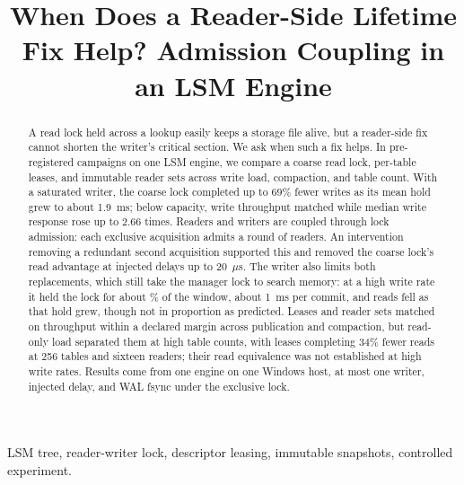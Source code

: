 \documentclass[conference]{IEEEtran}
\begin{document}
\raggedbottom
\title{When Does a Reader-Side Lifetime Fix Help? Admission Coupling in an LSM Engine}
\author{
}
\maketitle
\begin{abstract}
A read lock held across a lookup easily keeps a storage file alive, but a reader-side fix cannot shorten the writer's critical section. We ask when such a fix helps. In \FollowCampaignWord{} pre-registered campaigns on one LSM engine, we compare a coarse read lock, per-table leases, and immutable reader sets across write load, compaction, and table count. With a saturated writer, the coarse lock completed up to 69\% fewer writes as its mean hold grew to about 1.9~ms; below capacity, write throughput matched while median write response rose up to 2.66 times. Readers and writers are coupled through lock admission: each exclusive acquisition admits a round of readers. An intervention removing a redundant second acquisition supported this and removed the coarse lock's read advantage at injected delays up to 20~$\mu$s. The writer also limits both replacements, which still take the manager lock to search memory: at a high write rate it held the lock for about \FollowHoldAboutHigh\% of the window, about 1~ms per commit, and reads fell as that hold grew, though not in proportion as predicted. Leases and reader sets matched on throughput within a declared margin across publication and compaction, but read-only load separated them at high table counts, with leases completing 34\% fewer reads at 256 tables and sixteen readers; their read equivalence was not established at high write rates. Results come from one engine on one Windows host, at most one writer, injected delay, and WAL fsync under the exclusive lock.
\end{abstract}
\begin{IEEEkeywords}
LSM tree, reader-writer lock, descriptor leasing, immutable snapshots, controlled experiment.
\end{IEEEkeywords}
\end{document}

